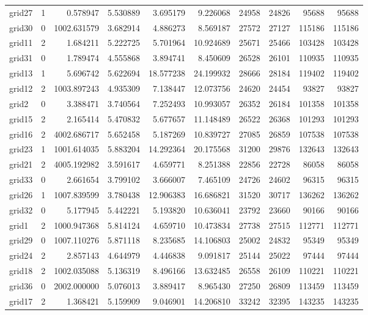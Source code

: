 \begin{longtable}{|l|r|r|r|r|r|r|r|r|r|}
grid27 & 1 & 0.578947 & 5.530889 & 3.695179 & 9.226068 & 24958 & 24826 & 95688 & 95688 \\
grid30 & 0 & 1002.631579 & 3.682914 & 4.886273 & 8.569187 & 27572 & 27127 & 115186 & 115186 \\
grid11 & 2 & 1.684211 & 5.222725 & 5.701964 & 10.924689 & 25671 & 25466 & 103428 & 103428 \\
grid31 & 0 & 1.789474 & 4.555868 & 3.894741 & 8.450609 & 26528 & 26101 & 110935 & 110935 \\
grid13 & 1 & 5.696742 & 5.622694 & 18.577238 & 24.199932 & 28666 & 28184 & 119402 & 119402 \\
grid12 & 2 & 1003.897243 & 4.935309 & 7.138447 & 12.073756 & 24620 & 24454 & 93827 & 93827 \\
grid2 & 0 & 3.388471 & 3.740564 & 7.252493 & 10.993057 & 26352 & 26184 & 101358 & 101358 \\
grid15 & 2 & 2.165414 & 5.470832 & 5.677657 & 11.148489 & 26522 & 26368 & 101293 & 101293 \\
grid16 & 2 & 4002.686717 & 5.652458 & 5.187269 & 10.839727 & 27085 & 26859 & 107538 & 107538 \\
grid23 & 1 & 1001.614035 & 5.883204 & 14.292364 & 20.175568 & 31200 & 29876 & 132643 & 132643 \\
grid21 & 2 & 4005.192982 & 3.591617 & 4.659771 & 8.251388 & 22856 & 22728 & 86058 & 86058 \\
grid33 & 0 & 2.661654 & 3.799102 & 3.666007 & 7.465109 & 24726 & 24602 & 96315 & 96315 \\
grid26 & 1 & 1007.839599 & 3.780438 & 12.906383 & 16.686821 & 31520 & 30717 & 136262 & 136262 \\
grid32 & 0 & 5.177945 & 5.442221 & 5.193820 & 10.636041 & 23792 & 23660 & 90166 & 90166 \\
grid1 & 2 & 1000.947368 & 5.814124 & 4.659710 & 10.473834 & 27738 & 27515 & 112771 & 112771 \\
grid29 & 0 & 1007.110276 & 5.871118 & 8.235685 & 14.106803 & 25002 & 24832 & 95349 & 95349 \\
grid24 & 2 & 2.857143 & 4.644979 & 4.446838 & 9.091817 & 25144 & 25022 & 97444 & 97444 \\
grid18 & 2 & 1002.035088 & 5.136319 & 8.496166 & 13.632485 & 26558 & 26109 & 110221 & 110221 \\
grid36 & 0 & 2002.000000 & 5.076013 & 3.889417 & 8.965430 & 27250 & 26809 & 113459 & 113459 \\
grid17 & 2 & 1.368421 & 5.159909 & 9.046901 & 14.206810 & 33242 & 32395 & 143235 & 143235 \\

\end{longtable}
